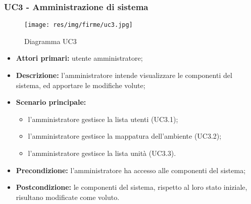 \subsubsection{UC3 - Amministrazione di sistema}
	\begin{center}
		\begin{figure}[h!]
			\texttt{[image: res/img/firme/uc3.jpg]}
			\caption{Diagramma UC3}
		\end{figure}
	\end{center}
	\begin{itemize}
		\item \textbf{Attori primari:} utente amministratore;
		\item \textbf{Descrizione:} l'amministratore intende visualizzare le componenti del sistema, ed apportare le modifiche volute;
		\item \textbf{Scenario principale:} 
			\begin{itemize}
				\item l'amministratore gestisce la lista utenti (UC3.1);
				\item l'amministratore gestisce la mappatura dell'ambiente (UC3.2);
				\item l'amministratore gestisce la lista unità (UC3.3).
			\end{itemize}
		\item \textbf{Precondizione:} l'amministratore ha accesso alle componenti del sistema;
		\item \textbf{Postcondizione:} le componenti del sistema, rispetto al loro stato iniziale, risultano modificate come voluto.
	\end{itemize}
	

